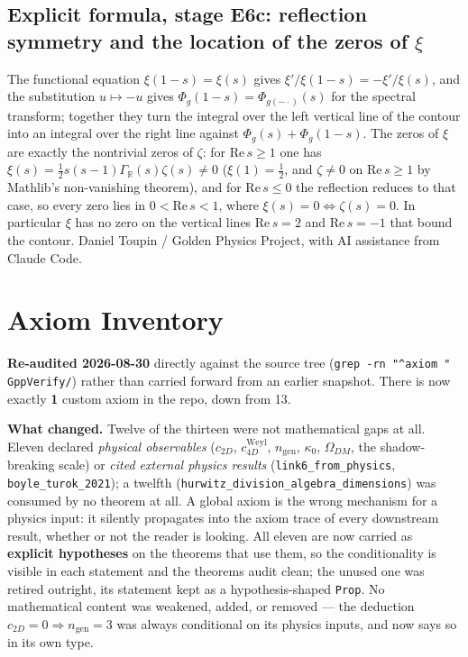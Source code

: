 \documentclass{report}
\theoremstyle{definition}
\begin{document}
\begin{itemize}
\begin{itemize}
\section{Explicit formula, stage E6c: reflection symmetry and the location of the zeros of $\xi$}
The functional equation $\xi(1-s)=\xi(s)$ gives $\xi'/\xi(1-s)=-\xi'/\xi(s)$, and the substitution $u\mapsto-u$ gives $\Phi_g(1-s)=\Phi_{g(-\cdot)}(s)$ for the spectral transform; together they turn the integral over the left vertical line of the contour into an integral over the right line against $\Phi_g(s)+\Phi_g(1-s)$. The zeros of $\xi$ are exactly the nontrivial zeros of $\zeta$: for $\mathrm{Re}\,s\ge1$ one has $\xi(s)=\tfrac12 s(s-1)\Gamma_{\mathbb R}(s)\zeta(s)\ne0$ ($\xi(1)=\tfrac12$, and $\zeta\ne0$ on $\mathrm{Re}\,s\ge1$ by Mathlib's non-vanishing theorem), and for $\mathrm{Re}\,s\le0$ the reflection reduces to that case, so every zero lies in $0<\mathrm{Re}\,s<1$, where $\xi(s)=0\iff\zeta(s)=0$. In particular $\xi$ has no zero on the vertical lines $\mathrm{Re}\,s=2$ and $\mathrm{Re}\,s=-1$ that bound the contour.
Daniel Toupin / Golden Physics Project, with AI assistance from Claude Code.


\chapter{Axiom Inventory}\label{sec:axiom-inventory}

\noindent\textbf{Re-audited 2026-08-30} directly against the source tree (\texttt{grep -rn
"\textasciicircum axiom " GppVerify/}) rather than carried forward from an earlier snapshot.
There is now exactly \textbf{1} custom axiom in the repo, down from 13.

\medskip
\noindent\textbf{What changed.} Twelve of the thirteen were not mathematical gaps at all.
Eleven declared \emph{physical observables} ($c_{2D}$, $c_{4D}^{\mathrm{Weyl}}$,
$n_{\mathrm{gen}}$, $\kappa_0$, $\Omega_{DM}$, the shadow-breaking scale) or \emph{cited
external physics results} (\texttt{link6\_from\_physics}, \texttt{boyle\_turok\_2021}); a
twelfth (\texttt{hurwitz\_division\_algebra\_dimensions}) was consumed by no theorem at all.
A global axiom is the wrong mechanism for a physics input: it silently propagates into the
axiom trace of every downstream result, whether or not the reader is looking. All eleven are
now carried as \textbf{explicit hypotheses} on the theorems that use them, so the
conditionality is visible in each statement and the theorems audit clean; the unused one was
retired outright, its statement kept as a hypothesis-shaped \texttt{Prop}. No mathematical
content was weakened, added, or removed --- the deduction
$c_{2D}=0 \Rightarrow n_{\mathrm{gen}}=3$ was always conditional on its physics inputs, and
now says so in its own type.


\end{itemize}
\end{itemize}
\end{document}

